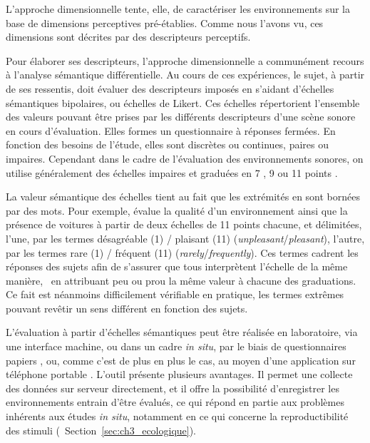 L'approche dimensionnelle tente, elle, de caractériser les environnements sur la base de dimensions perceptives pré-établies. Comme nous l'avons vu, ces dimensions sont décrites par des descripteurs perceptifs.

Pour élaborer ses descripteurs, l'approche dimensionnelle a communément recours à l'analyse sémantique différentielle. Au cours de ces expériences, le sujet, à partir de ses ressentis, doit évaluer des descripteurs imposés en s'aidant d'échelles sémantiques bipolaires, ou échelles de Likert. Ces échelles répertorient l'ensemble des valeurs pouvant être prises par les différents descripteurs d'une scène sonore en cours d'évaluation. Elles formes un questionnaire à réponses fermées. En fonction des besoins de l'étude, elles sont discrètes ou continues, paires ou impaires. Cependant dans le cadre de l'évaluation des environnements sonores, on utilise généralement des échelles impaires et graduées en 7 \citep{raimbault2006qualitative}, 9 \citep{hall2013exploratory} ou 11 points \citep{ricciardi2015sound}.

La valeur sémantique des échelles tient au fait que les extrémités en sont bornées par des mots. Pour exemple, \citep{ricciardi2015sound} évalue la qualité d'un environnement ainsi que la présence de voitures à partir de deux échelles de 11 points chacune, et délimitées, l'une, par les termes désagréable (1) / plaisant (11) (\emph{unpleasant}/\emph{pleasant}), l'autre, par les termes rare (1) / fréquent (11) (\emph{rarely}/\emph{frequently}). Ces termes cadrent les réponses des sujets afin de s'assurer que tous interprètent l'échelle de la même manière, \ie~en attribuant  peu ou prou la même valeur à chacune des graduations. Ce fait est néanmoins difficilement vérifiable en pratique, les termes extrêmes pouvant revêtir un sens différent en fonction des sujets.

L'évaluation à partir d'échelles sémantiques peut être réalisée en laboratoire, via une interface machine, ou dans un cadre \emph{in situ}, par le biais de questionnaires papiers \citep{jeon2013soundwalk,torija2013application}, ou, comme c'est de plus en plus le cas, au moyen d'une application sur téléphone portable \citep{kardous2014evaluation,ricciardi2015sound}. L'outil présente plusieurs avantages. Il permet une collecte des données sur serveur directement, et il offre la possibilité d'enregistrer les environnements entrain d'être évalués, ce qui répond en partie aux problèmes inhérents aux études \emph{in situ}, notamment en ce qui concerne la reproductibilité des stimuli (\cf~Section~\ref{sec:ch3_ecologique}).

